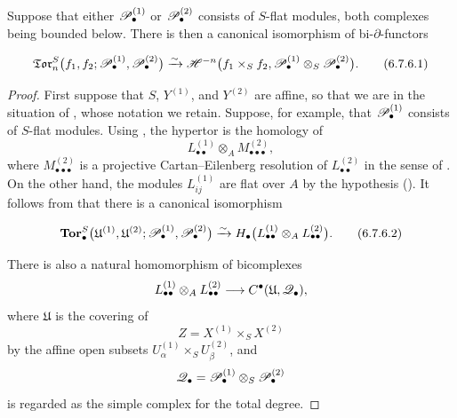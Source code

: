 \begin{proposition}[6.7.6]
\label{III.6.7.6}
Suppose that either $\mathscr{P}_\bullet^{(1)}$ or
$\mathscr{P}_\bullet^{(2)}$ consists of $S$-flat modules, both
complexes being bounded below.  There is then a canonical
isomorphism of bi-$\partial$-functors
\begin{env}[6.7.6.1]
\label{III.6.7.6.1}
\[
  \mathfrak{Tor}_n^S
  \bigl(
    f_1,f_2;
    \sh P_\bullet^{(1)},\sh P_\bullet^{(2)}
  \bigr)
  \xrightarrow{\sim}
  \sh H^{-n}
  \bigl(
    f_1\times_Sf_2,
    \sh P_\bullet^{(1)}
    \otimes_S\sh P_\bullet^{(2)}
  \bigr).
  \tag{6.7.6.1}\label{III.6.7.6.1.eq}
\]
\end{env}
\end{proposition}

\begin{proof}
First suppose that $S$, $Y^{(1)}$, and $Y^{(2)}$ are affine, so
that we are in the situation of , whose notation
we retain.  Suppose, for example, that
$\mathscr{P}_\bullet^{(1)}$ consists of $S$-flat modules.  Using
, the hypertor is the homology of
\[
  L_{\bullet\bullet}^{(1)}
  \otimes_A M_{\bullet\bullet\bullet}^{(2)},
\]
where $M_{\bullet\bullet\bullet}^{(2)}$ is a projective
Cartan--Eilenberg resolution of $L_{\bullet\bullet}^{(2)}$ in
the sense of .  On the other hand, the modules
$L_{ij}^{(1)}$ are flat over $A$ by the hypothesis
().  It follows from
 that there is a canonical isomorphism
\begin{env}[6.7.6.2]
\label{III.6.7.6.2}
\[
  \mathbf{Tor}_\bullet^S
  \bigl(
    \mathfrak U^{(1)},\mathfrak U^{(2)};
    \sh P_\bullet^{(1)},\sh P_\bullet^{(2)}
  \bigr)
  \xrightarrow{\sim}
  H_\bullet
  \bigl(
    L_{\bullet\bullet}^{(1)}
    \otimes_A L_{\bullet\bullet}^{(2)}
  \bigr).
  \tag{6.7.6.2}\label{III.6.7.6.2.eq}
\]
\end{env}

There is also a natural homomorphism of bicomplexes
\[
  L_{\bullet\bullet}^{(1)}
  \otimes_A L_{\bullet\bullet}^{(2)}
  \longrightarrow
  C^\bullet(\mathfrak U,\mathscr{Q}_\bullet),
\]
where $\mathfrak U$ is the covering of
\[
  Z=X^{(1)}\times_SX^{(2)}
\]
by the affine open subsets
$U_\alpha^{(1)}\times_SU_\beta^{(2)}$, and
\[
  \mathscr{Q}_\bullet
  =
  \mathscr{P}_\bullet^{(1)}
  \otimes_S\mathscr{P}_\bullet^{(2)}
\]
is regarded as the simple complex for the total degree.



\end{proof}

